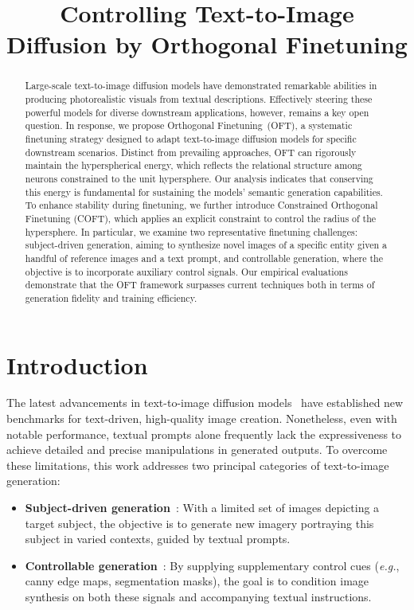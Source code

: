 \title{Controlling Text-to-Image Diffusion by Orthogonal Finetuning}

\begin{abstract}
Large-scale text-to-image diffusion models have demonstrated remarkable abilities in producing photorealistic visuals from textual descriptions. Effectively steering these powerful models for diverse downstream applications, however, remains a key open question. In response, we propose Orthogonal Finetuning~(OFT), a systematic finetuning strategy designed to adapt text-to-image diffusion models for specific downstream scenarios. Distinct from prevailing approaches, OFT can rigorously maintain the hyperspherical energy, which reflects the relational structure among neurons constrained to the unit hypersphere. Our analysis indicates that conserving this energy is fundamental for sustaining the models' semantic generation capabilities. To enhance stability during finetuning, we further introduce Constrained Orthogonal Finetuning (COFT), which applies an explicit constraint to control the radius of the hypersphere. In particular, we examine two representative finetuning challenges: subject-driven generation, aiming to synthesize novel images of a specific entity given a handful of reference images and a text prompt, and controllable generation, where the objective is to incorporate auxiliary control signals. Our empirical evaluations demonstrate that the OFT framework surpasses current techniques both in terms of generation fidelity and training efficiency.
\end{abstract}

\section{Introduction}

The latest advancements in text-to-image diffusion models~\cite{saharia2022photorealistic,ramesh2022hierarchical,rombach2022high} have established new benchmarks for text-driven, high-quality image creation. Nonetheless, even with notable performance, textual prompts alone frequently lack the expressiveness to achieve detailed and precise manipulations in generated outputs. To overcome these limitations, this work addresses two principal categories of text-to-image generation:

\begin{itemize}[leftmargin=*,nosep]

    \item \textbf{Subject-driven generation}~\cite{ruiz2023dreambooth}: With a limited set of images depicting a target subject, the objective is to generate new imagery portraying this subject in varied contexts, guided by textual prompts.
    \item \textbf{Controllable generation}~\cite{zhang2023adding,mou2023t2i}: By supplying supplementary control cues (\emph{e.g.}, canny edge maps, segmentation masks), the goal is to condition image synthesis on both these signals and accompanying textual instructions.
\end{itemize}

